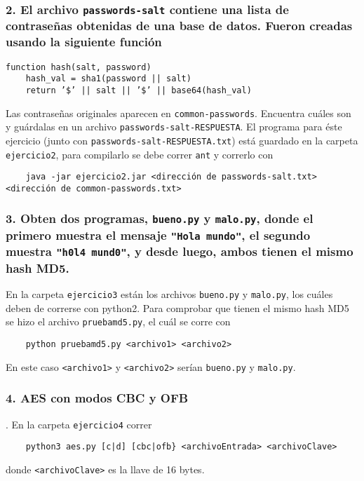 \documentclass[14pt]{article}
\begin{document}
\subsubsection*{2. El archivo \texttt{passwords-salt} contiene una lista de contraseñas obtenidas de una base de datos. Fueron creadas usando la siguiente función}
\begin{verbatim}
function hash(salt, password)
    hash_val = sha1(password || salt)
    return ’$’ || salt || ’$’ || base64(hash_val)
\end{verbatim}
Las contraseñas originales aparecen en \texttt{common-passwords}. Encuentra cuáles son y guárdalas en un archivo \texttt{passwords-salt-RESPUESTA}.
El programa para éste ejercicio (junto con \texttt{passwords-salt-RESPUESTA.txt}) está guardado en la carpeta \texttt{ejercicio2}, para compilarlo se debe correr \texttt{ant} y correrlo con
\begin{verbatim}
    java -jar ejercicio2.jar <dirección de passwords-salt.txt> <dirección de common-passwords.txt>
\end{verbatim}

\subsubsection*{3. Obten dos programas, \texttt{bueno.py} y \texttt{malo.py}, donde el primero muestra el mensaje \texttt{"Hola mundo"}, el segundo muestra \texttt{"h0l4 mund0"}, y desde luego, ambos tienen el mismo hash MD5.}
En la carpeta \texttt{ejercicio3} están los archivos \texttt{bueno.py} y \texttt{malo.py}, los cuáles deben de correrse con \textsf{python2}. Para comprobar que tienen el mismo hash MD5 se hizo el archivo \texttt{pruebamd5.py}, el cuál se corre con 
\begin{verbatim}
    python pruebamd5.py <archivo1> <archivo2>
\end{verbatim}
En este caso \texttt{<archivo1>} y \texttt{<archivo2>} serían \texttt{bueno.py} y \texttt{malo.py}.

\subsubsection*{4. AES con modos CBC y OFB}.
En la carpeta \texttt{ejercicio4} correr
\begin{verbatim}
    python3 aes.py [c|d] [cbc|ofb} <archivoEntrada> <archivoClave>
\end{verbatim}
donde \texttt{<archivoClave>} es la llave de 16 bytes.
\end{document}
